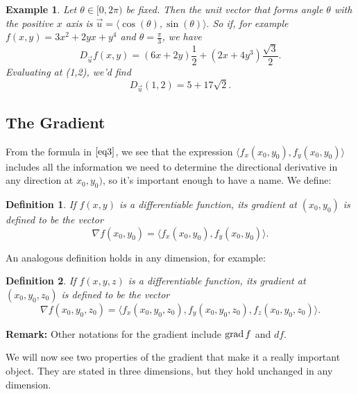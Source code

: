 \documentclass[12pt]{article}
\newtheorem{example}{Example}
\newtheorem{definition}{Definition}
\renewcommand{\n}{\nabla}
\newcommand{\vu}{\vec{u}}
\begin{document}
\begin{example} Let $\theta\in[0,2\pi)$ be fixed. Then the unit vector that forms angle $\theta$ with the positive $x$ axis is $\vu=\langle\cos(\theta),\sin(\theta)\rangle.$ So if, for example $f(x,y)=3x^2+2yx+y^4$  and $\theta=\frac{\pi}{3}$, we have $$D_{\vu}f(x,y)=(6x+2y)\frac{1}{2}+(2x+4y^3)\frac{\sqrt{3}}{2}.$$
Evaluating at (1,2), we'd find
$$D_{\vu}(1,2)=5+17\sqrt{2}.$$
\end{example}
\subsection*{The Gradient}
From the formula in $\eqref{eq3}$, we see that the expression  $\langle f_x(x_0,y_0),f_y(x_0,y_0)\rangle$ includes all the information we need to determine the directional derivative in any direction at $x_0,y_0)$, so it's important enough to have a name. We define:
\begin{definition} If $f(x,y) $ is a differentiable function, its gradient at $(x_0,y_0)$ is defined to be the vector $$\n f(x_0,y_0)=\langle f_x(x_0,y_0),f_y(x_0,y_0)\rangle.$$
\end{definition}

An analogous definition holds in any dimension, for example:
\begin{definition} If $f(x,y,z) $ is a differentiable function, its gradient at $(x_0,y_0,z_0)$ is defined to be the vector $$\n f(x_0,y_0,z_0)=\langle f_x(x_0,y_0,z_0),f_y(x_0,y_0,z_0),f_z(x_0,y_0,z_0)\rangle.$$
\end{definition}
\textbf{Remark:} Other notations for the gradient include $\operatorname{grad} f$ and $df$.

We will now see two properties of the gradient that make it a really important object. They are stated in three dimensions, but they hold unchanged in any dimension.
\end{document}
